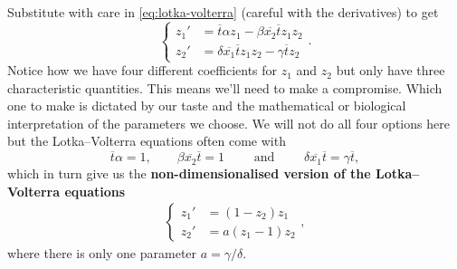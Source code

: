Substitute with care in \ref{eq:lotka-volterra} (careful with the derivatives) to get
\[
  \begin{cases}
    z_1' &= \overline{t} \alpha z_1 - \beta \overline{x_2} \overline{t} z_1 z_2 \\
    z_2' &= \delta \overline{x_1}\overline{t} z_1 z_2 - \gamma \overline{t} z_2
  \end{cases}.
\]
Notice how we have four different coefficients for $z_1$ and $z_2$ but only
have three characteristic quantities. This means we'll need to make a
compromise. Which one to make is dictated by our taste and the mathematical or
biological interpretation of the parameters we choose. We will not do all four
options here but the Lotka--Volterra equations often come with
\[
  \overline{t} \alpha = 1,
  \qquad \beta \overline{x_2} \overline{t} = 1 \qquad \text{ and } \qquad
  \delta \overline{x_1} \overline{t} = \gamma \overline{t},
\]
which in turn give us the \textbf{non-dimensionalised version of the
Lotka--Volterra equations}
\begin{align}
  \label{eq:non-dim-lotka-volterra}
  \begin{cases}
    z_1' &= (1 - z_2) z_1 \\
    z_2' &= a (z_1 - 1) z_2
  \end{cases},
\end{align}
where there is only one parameter $a = \gamma / \delta$. 

